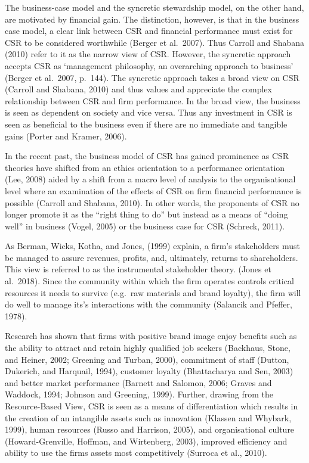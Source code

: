 \documentclass[
]{mitthesis}
\begin{document}
The business-case model and the syncretic stewardship model, on the other hand, are motivated by financial gain. The distinction, however, is that in the business case model, a clear link between CSR and financial performance must exist for CSR to be considered worthwhile (Berger et al.~2007). Thus Carroll and Shabana (2010) refer to it as the narrow view of CSR. However, the syncretic approach accepts CSR as `management philosophy, an overarching approach to business' (Berger et al.~2007, p.~144). The syncretic approach takes a broad view on CSR (Carroll and Shabana, 2010) and thus values and appreciate the complex relationship between CSR and firm performance. In the broad view, the business is seen as dependent on society and vice versa. Thus any investment in CSR is seen as beneficial to the business even if there are no immediate and tangible gains (Porter and Kramer, 2006).

In the recent past, the business model of CSR has gained prominence as CSR theories have shifted from an ethics orientation to a performance orientation (Lee, 2008) aided by a shift from a macro level of analysis to the organisational level where an examination of the effects of CSR on firm financial performance is possible (Carroll and Shabana, 2010). In other words, the proponents of CSR no longer promote it as the ``right thing to do'' but instead as a means of ``doing well'' in business (Vogel, 2005) or the business case for CSR (Schreck, 2011).

As Berman, Wicks, Kotha, and Jones, (1999) explain, a firm's stakeholders must be managed to assure revenues, profits, and, ultimately, returns to shareholders. This view is referred to as the instrumental stakeholder theory. (Jones et al.~2018). Since the community within which the firm operates controls critical resources it needs to survive (e.g.~raw materials and brand loyalty), the firm will do well to manage its's interactions with the community (Salancik and Pfeffer, 1978).

Research has shown that firms with positive brand image enjoy benefits such as the ability to attract and retain highly qualified job seekers (Backhaus, Stone, and Heiner, 2002; Greening and Turban, 2000), commitment of staff (Dutton, Dukerich, and Harquail, 1994), customer loyalty (Bhattacharya and Sen, 2003) and better market performance (Barnett and Salomon, 2006; Graves and Waddock, 1994; Johnson and Greening, 1999). Further, drawing from the Resource-Based View, CSR is seen as a means of differentiation which results in the creation of an intangible assets such as innovation (Klassen and Whybark, 1999), human resources (Russo and Harrison, 2005), and organisational culture (Howard-Grenville, Hoffman, and Wirtenberg, 2003), improved efficiency and ability to use the firms assets most competitively (Surroca et al., 2010).
\end{document}
